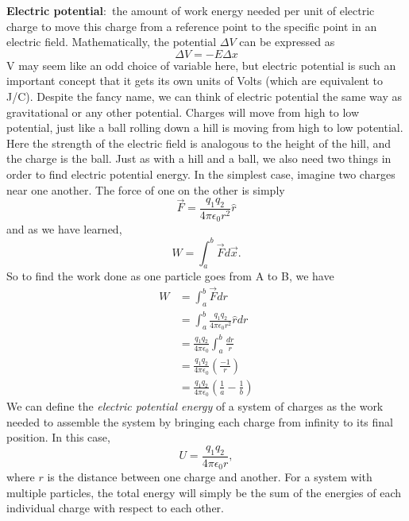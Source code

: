 \documentclass[nobib]{tufte-handout}
\newcommand{\defn}[2]{\noindent\textbf{#1}:\ #2}
\begin{document}
\defn{Electric potential}{the amount of work energy needed 
per unit of electric charge to move this charge from a 
reference point to the specific point in an electric field}.
Mathematically, the potential $\Delta V$ can be expressed as
\[\Delta V = -E\Delta x\]
V may seem like an odd choice of variable here, but electric 
potential is such an important concept that it gets its own
units of Volts (which are equivalent to J/C).
Despite the fancy name, we can think of electric potential the 
same way as gravitational or any other potential. Charges
will move from high to low potential, just like a ball rolling 
down a hill is moving from high to low potential. 
Here the strength of the electric field is analogous 
to the height of the hill, and the charge is the ball. 
Just as with a hill and a ball, we also need two things 
in order to find electric potential energy. 
In the simplest case, 
imagine two charges near one another. The force 
of one on the other is simply 
\[\vec{F} = \frac{q_1 q_2}{4 \pi \epsilon_0 r^2}\hat{r}\]
and as we have learned, 
\[W = \int_{a}^{b}\vec{F} d\vec{x}.\]
So to find the work done as one 
particle goes from A to B, we have 
\begin{align*}
    W &= \int_{a}^{b} \vec{F}dr \\
    &= \int_{a}^{b} \frac{q_1 q_2}{4 \pi \epsilon_0 r^2}\hat{r} dr \\
    &= \frac{q_1 q_2}{4 \pi \epsilon_0} \int_{a}^{b} \frac{dr}{r} \\
    &= \frac{q_1 q_2}{4 \pi \epsilon_0} \left(\frac{-1}{r}\right) \\
    &= \frac{q_1 q_2}{4 \pi \epsilon_0} \left(\frac{1}{a}-\frac{1}{b}\right)
\end{align*}
We can define the \emph{electric potential energy}
of a system of charges as
the work needed to assemble the
system by bringing each
charge from infinity to its
final position. 
In this case, 
\[U = \frac{q_1 q_2}{4 \pi \epsilon_0 r},\]
where $r$ is the distance between one charge 
and another. For a system with multiple particles, 
the total energy will simply be the sum 
of the energies of each individual charge with 
respect to each other.
\end{document}
